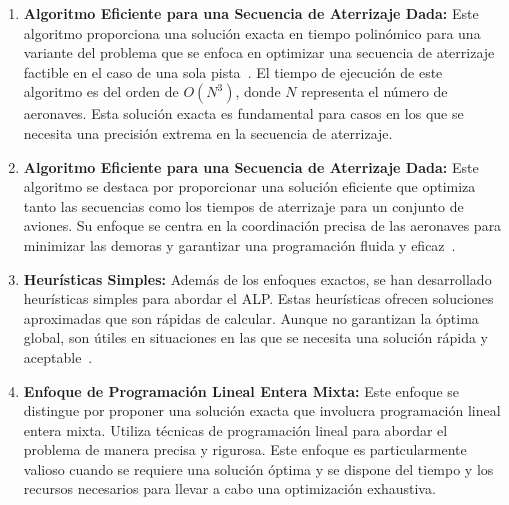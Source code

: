\documentclass[letter, 10pt]{article}
\begin{document}
\begin{enumerate}
    \item \textbf{Algoritmo Eficiente para una Secuencia de Aterrizaje Dada:} Este algoritmo proporciona una soluci\'on exacta en tiempo polin\'omico para una variante del problema que se enfoca en optimizar una secuencia de aterrizaje factible en el caso de una sola pista~\cite{awasthi2013aircraft}. El tiempo de ejecuci\'on de este algoritmo es del orden de $O(N^3)$, donde $N$ representa el n\'umero de aeronaves. Esta soluci\'on exacta es fundamental para casos en los que se necesita una precisi\'on extrema en la secuencia de aterrizaje.
    
    \item \textbf{Algoritmo Eficiente para una Secuencia de Aterrizaje Dada:} Este algoritmo se destaca por proporcionar una soluci\'on eficiente que optimiza tanto las secuencias como los tiempos de aterrizaje para un conjunto de aviones. Su enfoque se centra en la coordinaci\'on precisa de las aeronaves para minimizar las demoras y garantizar una programaci\'on fluida y eficaz~\cite{awasthi2013aircraft}.
    
    \item \textbf{Heur\'isticas Simples:} Adem\'as de los enfoques exactos, se han desarrollado heur\'isticas simples para abordar el ALP. Estas heur\'isticas ofrecen soluciones aproximadas que son r\'apidas de calcular. Aunque no garantizan la \'optima global, son \'utiles en situaciones en las que se necesita una soluci\'on r\'apida y aceptable~\cite{salehipour2018algorithm}.
    
    \item \textbf{Enfoque de Programaci\'on Lineal Entera Mixta:} Este enfoque se distingue por proponer una soluci\'on exacta que involucra programaci\'on lineal entera mixta. Utiliza t\'ecnicas de programaci\'on lineal para abordar el problema de manera precisa y rigurosa. Este enfoque es particularmente valioso cuando se requiere una soluci\'on \'optima y se dispone del tiempo y los recursos necesarios para llevar a cabo una optimizaci\'on exhaustiva.
\end{enumerate}
\end{document}
